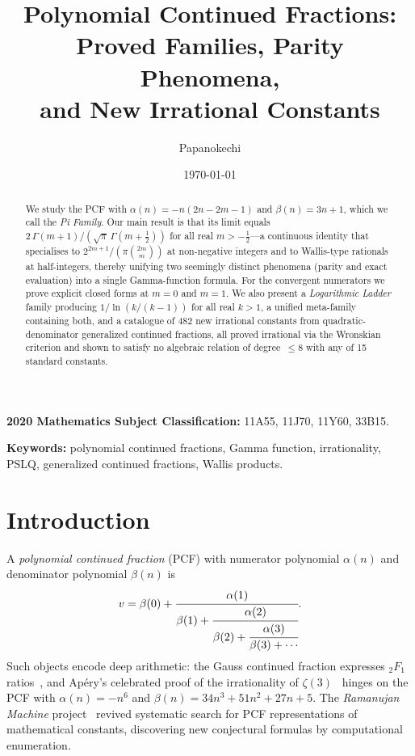 \documentclass[11pt,a4paper]{article}
\title{Polynomial Continued Fractions: Proved Families, Parity Phenomena,\\and New Irrational Constants}
\author{Papanokechi}
\date{\today}
\theoremstyle{definition}
\theoremstyle{remark}
\begin{document}
\maketitle

\begin{abstract}
We study the PCF with $\alpha(n) = -n(2n{-}2m{-}1)$ and $\beta(n) = 3n+1$,
which we call the \emph{Pi Family}. Our main result is that its limit equals
$2\,\Gamma(m{+}1)/(\sqrt{\pi}\,\Gamma(m{+}\tfrac{1}{2}))$
for all real $m > -\frac{1}{2}$---a continuous identity that specialises to
$2^{2m+1}/(\pi\binom{2m}{m})$ at non-negative integers and to Wallis-type
rationals at half-integers, thereby unifying two seemingly distinct phenomena
(parity and exact evaluation) into a single Gamma-function formula.
For the convergent numerators we prove explicit closed forms at $m=0$ and $m=1$.
We also present a \emph{Logarithmic Ladder} family producing $1/\ln(k/(k{-}1))$
for all real $k>1$, a unified meta-family containing both,
and a catalogue of 482 new irrational constants from quadratic-denominator
generalized continued fractions, all proved irrational via the Wronskian criterion
and shown to satisfy no algebraic relation of degree~$\le 8$ with any of
15 standard constants.
\end{abstract}

\noindent
\textbf{2020 Mathematics Subject Classification:} 11A55, 11J70, 11Y60, 33B15.

\noindent
\textbf{Keywords:} polynomial continued fractions, Gamma function, irrationality, PSLQ, generalized continued fractions, Wallis products.

\section{Introduction}

A \emph{polynomial continued fraction} (PCF) with numerator polynomial
$\alpha(n)$ and denominator polynomial $\beta(n)$ is
\[
  v = \beta(0) + \cfrac{\alpha(1)}{\beta(1) + \cfrac{\alpha(2)}{\beta(2) + \cfrac{\alpha(3)}{\beta(3) + \cdots}}}.
\]
Such objects encode deep arithmetic:  the Gauss continued fraction
expresses ${}_2F_1$ ratios~\cite{wall1948,lorentzen2008}, and Ap\'ery's
celebrated proof of the irrationality of $\zeta(3)$~\cite{apery1979} hinges on the PCF
with $\alpha(n) = -n^6$ and $\beta(n) = 34n^3 + 51n^2 + 27n + 5$.
The \emph{Ramanujan Machine} project~\cite{raayoni2021} revived
systematic search for PCF representations of mathematical constants,
discovering new conjectural formulas by computational enumeration.
\end{document}
